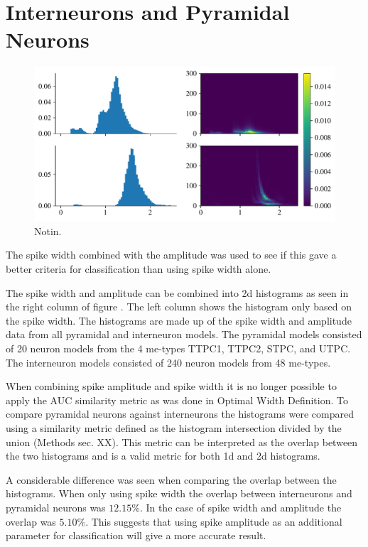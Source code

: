 \documentclass[altfont, fleqn]{uiophd}
\renewcommand{\cref}[1]{{\color{viridis_03}\mycref{#1}}}
\renewcommand{\Cref}[1]{{\color{viridis_03}\myCref{#1}}}
\begin{document}

\newpage
\section{Interneurons and Pyramidal Neurons}
\begin{figure}[h]
    \begin{center}
        \includegraphics[width=\linewidth]{images/sec_4/int_pyr_hist.pdf}
        \caption{Notin.}
        \label{fig:4_int_pyr_hist}
    \end{center}
\end{figure}
The spike width combined with the amplitude was
used to see if this gave a better criteria for
classification than
using spike width alone.

The spike width and amplitude
can be combined into
2d histograms as seen in the right column of
figure \cref{fig:4_int_pyr_hist}. 
The left column shows the histogram only based on the spike width.
The histograms are made up of the spike width and amplitude
data from all pyramidal and interneuron models.
The pyramidal models consisted of 20 neuron models
from the 4 me-types
TTPC1, TTPC2, STPC, and UTPC. 
The interneuron models consisted of 240 neuron models
from 48 me-types.

When combining spike amplitude and spike width it is no longer
possible to apply the AUC similarity metric as was done in 
Optimal Width Definition.
To compare pyramidal neurons against interneurons
the histograms were compared using a similarity metric 
defined as the histogram intersection divided by the union (Methods sec. XX). 
This metric can be interpreted as the overlap between the two histograms
and is a valid metric for both 1d and 2d histograms.

A considerable difference was seen when comparing the overlap
between the histograms. 
When only using spike width the overlap between interneurons
and pyramidal neurons was $12.15\%$.
In the case of spike width and amplitude the overlap
was $5.10\%$.
This suggests that using spike amplitude as an additional 
parameter for classification will give a more accurate result. 
\end{document}
